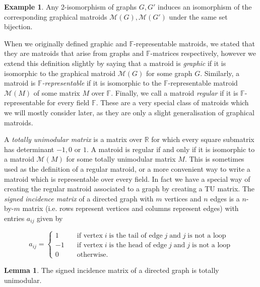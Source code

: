 \documentclass[12pt]{report}
\theoremstyle{definition}
\newtheorem{lemma}[theorem]{Lemma}
\newtheorem{example}[theorem]{Example}
\def\F{\mathbb F}
\def\R{\mathbb R}
\def\calM{\mathcal M}
\theoremstyle{upright}
\begin{document}
\begin{example}

    Any 2-isomorphism of graphs $G, G'$ induces an isomorphism of the corresponding graphical matroids $\calM(G), \calM(G')$ under the same set bijection.
    
\end{example}

When we originally defined graphic and $\F$-representable matroids, we stated that they are matroids that arise from graphs and $\F$-matrices respectively, however we extend this definition slightly by saying that a matroid is \textit{graphic} if it is isomorphic to the graphical matroid $\calM(G)$ for some graph $G$.
Similarly, a matroid is {\em $\F$-representable} if it is isomorphic to the $\F$-representable matroid $\calM(M)$ of some matrix $M$ over $\F$.
Finally, we call a matroid \textit{regular} if it is $\F$-representable for every field $\F$.
These are a very special class of matroids which we will mostly consider later, as they are only a slight generalisation of graphical matroids.

A {\em totally unimodular matrix} is a matrix over $\R$ for which every square submatrix has determinant $-1, 0$ or $1$.
A matroid is regular if and only if it is isomorphic to a matroid $\calM(M)$ for some totally unimodular matrix $M$.
This is sometimes used as the definition of a regular matroid, or a more convenient way to write a matroid which is representable over every field.
In fact we have a special way of creating the regular matroid associated to a graph by creating a TU matrix.
The {\em signed incidence matrix} of a directed graph with $m$ vertices and $n$ edges is a $n$-by-$m$ matrix (i.e. rows represent vertices and columns represent edges) with entries $a_{ij}$ given by

\[a_{ij}=\begin{cases}
    1\quad&\text{if vertex}\;i\;\text{is the tail of edge}\;j\;\text{and}\;j\;\text{is not a loop}\\
    -1\quad&\text{if vertex}\;i\;\text{is the head of edge}\;j\;\text{and}\;j\;\text{is not a loop}\\
    0\quad&\text{otherwise.}
\end{cases}\]



\begin{lemma}

    The signed incidence matrix of a directed graph is totally unimodular.
    
\end{lemma}
\end{document}
